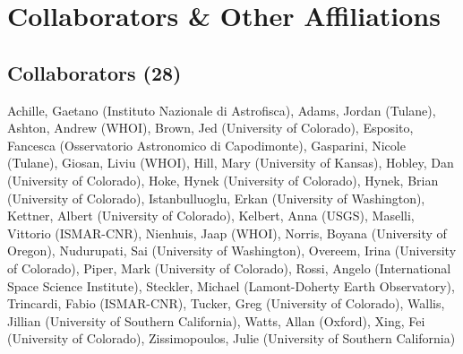 \documentclass[letterpaper]{resume}
\begin{document}

%
%




\section{Collaborators \& Other Affiliations}
\subsection{Collaborators (28)}

  Achille, Gaetano (Instituto Nazionale di Astrofisca),
  Adams, Jordan (Tulane),
  Ashton, Andrew  (WHOI),
  Brown, Jed (University of Colorado),
  Esposito, Fancesca (Osservatorio Astronomico di Capodimonte),
  Gasparini, Nicole (Tulane),
  Giosan, Liviu (WHOI),
  Hill, Mary (University of Kansas),
  Hobley, Dan (University of Colorado),
  Hoke, Hynek (University of Colorado),
  Hynek, Brian (University of Colorado),
  Istanbulluoglu, Erkan (University of Washington),
  Kettner, Albert (University of Colorado),
  Kelbert, Anna (USGS),
  Maselli, Vittorio (ISMAR-CNR),
  Nienhuis, Jaap (WHOI),
  Norris, Boyana (University of Oregon),
  Nudurupati, Sai (University of Washington),
  Overeem, Irina (University of Colorado),
  Piper, Mark (University of Colorado),
  Rossi, Angelo (International Space Science Institute),
  Steckler, Michael (Lamont-Doherty Earth Observatory),
  Trincardi, Fabio (ISMAR-CNR),
  Tucker, Greg (University of Colorado),
  Wallis, Jillian (University of Southern California),
  Watts, Allan (Oxford),
  Xing, Fei (University of Colorado),
  Zissimopoulos, Julie (University of Southern California)
\end{document}
